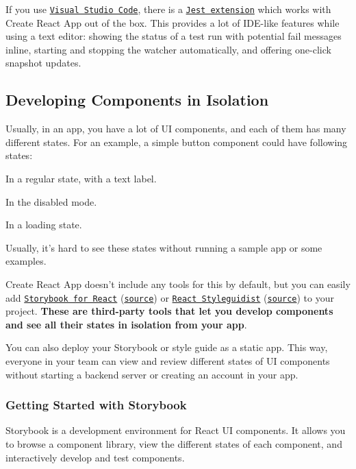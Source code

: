 If you use \href{https://code.visualstudio.com}{\tt Visual Studio Code}, there is a \href{https://github.com/orta/vscode-jest}{\tt Jest extension} which works with Create React App out of the box. This provides a lot of I\+D\+E-\/like features while using a text editor\+: showing the status of a test run with potential fail messages inline, starting and stopping the watcher automatically, and offering one-\/click snapshot updates.



\subsection*{Developing Components in Isolation}

Usually, in an app, you have a lot of UI components, and each of them has many different states. For an example, a simple button component could have following states\+:


\begin{DoxyItemize}
\item In a regular state, with a text label.
\item In the disabled mode.
\item In a loading state.
\end{DoxyItemize}

Usually, it’s hard to see these states without running a sample app or some examples.

Create React App doesn’t include any tools for this by default, but you can easily add \href{https://storybook.js.org}{\tt Storybook for React} (\href{https://github.com/storybooks/storybook}{\tt source}) or \href{https://react-styleguidist.js.org/}{\tt React Styleguidist} (\href{https://github.com/styleguidist/react-styleguidist}{\tt source}) to your project. {\bfseries These are third-\/party tools that let you develop components and see all their states in isolation from your app}.



You can also deploy your Storybook or style guide as a static app. This way, everyone in your team can view and review different states of UI components without starting a backend server or creating an account in your app.

\subsubsection*{Getting Started with Storybook}

Storybook is a development environment for React UI components. It allows you to browse a component library, view the different states of each component, and interactively develop and test components.

